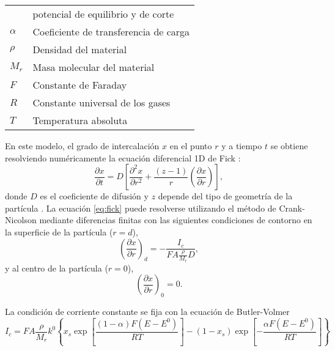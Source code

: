 \begin{table}[h!]
{\begin{tabular}{l l}
                                     & potencial de equilibrio y de corte \\
        $\alpha$ & Coeficiente de transferencia de carga \\
        $\rho$ & Densidad del material \\
        $M_r$ & Masa molecular del material \\
        $F$ & Constante de Faraday \\
        $R$ & Constante universal de los gases \\
        $T$ & Temperatura absoluta \\
        \bottomrule
    \end{tabular}
    }{}
    \label{t:params}
\end{table}

En este modelo, el grado de intercalación $x$ en el punto $r$ y a tiempo $t$ se 
obtiene resolviendo numéricamente la ecuación diferencial 1D de Fick \cite{bard-electrochemistry}:
\begin{equation}\label{eq:fick}
    \frac{\partial x}{\partial t} = D \left[ \frac{\partial^2 x}{\partial r^2} + \frac{(z - 1)}{r} \left(\frac{\partial x}{\partial r}\right) \right],
\end{equation}
donde $D$ es el coeficiente de difusión y $z$ depende del tipo de geometría de la 
partícula \cite{vassiliev2016}. La ecuación \ref{eq:fick} puede resolverse 
utilizando el método de Crank-Nicolson mediante diferencias finitas 
\cite{crank-nicolson} con las siguientes condiciones de contorno en la superficie
de la partícula ($r = d$),
\begin{equation}
    \left(\frac{\partial x}{\partial r}\right)_d = - \frac{I_c}{F A \frac{\rho}{M_r}D},
\end{equation}
y al centro de la partícula ($r = 0$),
\begin{equation}
    \left(\frac{\partial x}{\partial r}\right)_0 = 0.
\end{equation}

La condición de corriente constante se fija con la ecuación de Butler-Volmer \cite{bard-electrochemistry}
\begin{equation}\label{eq:bv}
    I_c = F A \frac{\rho}{M_r} k^0 \left\{x_s \exp\left[ \frac{(1-\alpha)F(E-E^0)}{RT} \right] - (1 - x_s) \exp\left[ -\frac{\alpha F (E-E^0)}{RT} \right] \right\}
\end{equation}

